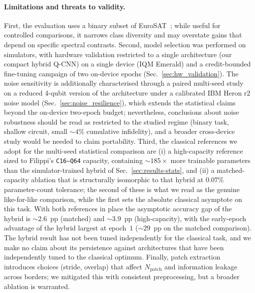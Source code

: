 \paragraph{Limitations and threats to validity.}
First, the evaluation uses a binary subset of EuroSAT~\cite{Helber2019}; while useful for controlled comparisons, it narrows class diversity and may overstate gains that depend on specific spectral contrasts. Second, model selection was performed on simulators, with hardware validation restricted to a single architecture (our compact hybrid Q-CNN) on a single device (IQM Emerald) and a credit-bounded fine-tuning campaign of two on-device epochs (Sec.~\ref{sec:hw_validation}). The noise sensitivity is additionally characterised through a paired multi-seed study on a reduced 4-qubit version of the architecture under a calibrated IBM Heron r2 noise model (Sec.~\ref{sec:noise_resilience}), which extends the statistical claims beyond the on-device two-epoch budget; nevertheless, conclusions about noise robustness should be read as restricted to the studied regime (binary task, shallow circuit, small $\sim 4\%$ cumulative infidelity), and a broader cross-device study would be needed to claim portability. Third, the classical references we adopt for the multi-seed statistical comparison are (i) a high-capacity reference sized to Filippi's \texttt{C16--Q64} capacity, containing $\sim$$185\times$ more trainable parameters than the simulator-trained hybrid of Sec.~\ref{sec:results-stats}, and (ii) a matched-capacity ablation that is structurally isomorphic to that hybrid at $0.07\%$ parameter-count tolerance; the second of these is what we read as the genuine like-for-like comparison, while the first sets the absolute classical asymptote on this task. With both references in place the asymptotic accuracy gap of the hybrid is $\sim$$2.6$~pp (matched) and $\sim$$3.9$~pp (high-capacity), with the early-epoch advantage of the hybrid largest at epoch~$1$ ($\sim$$29$~pp on the matched comparison). The hybrid result has not been tuned independently for the classical task, and we make no claim about its persistence against architectures that have been independently tuned to the classical optimum. Finally, patch extraction introduces choices (stride, overlap) that affect $N_{\text{patch}}$ and information leakage across borders; we mitigated this with consistent preprocessing, but a broader ablation is warranted.

